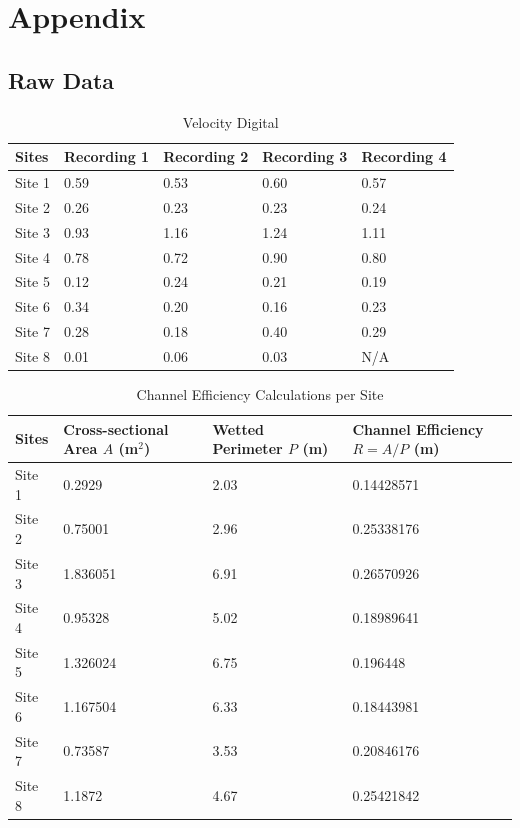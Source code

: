 \section{Appendix}

\subsection{Raw Data}

\begin{table}[H]
	\centering
	\begin{tabularx}{\textwidth}{l *{4}{Y}}
		\hline
		Sites & Recording 1 & Recording 2 & Recording 3 & Recording 4 \\
		\hline
		Site 1 & 0.59 & 0.53 & 0.60 & 0.57 \\
		Site 2 & 0.26 & 0.23 & 0.23 & 0.24 \\
		Site 3 & 0.93 & 1.16 & 1.24 & 1.11 \\
		Site 4 & 0.78 & 0.72 & 0.90 & 0.80 \\
		Site 5 & 0.12 & 0.24 & 0.21 & 0.19 \\
		Site 6 & 0.34 & 0.20 & 0.16 & 0.23 \\
		Site 7 & 0.28 & 0.18 & 0.40 & 0.29 \\
		Site 8 & 0.01 & 0.06 & 0.03 & N/A \\
		\hline
	\end{tabularx}
	\caption{Velocity Digital}
	\label{tab:velocity_digital_raw}
\end{table}

\begin{table}[H]
	\centering
	\begin{tabularx}{\textwidth}{l *{3}{Y}}
		\hline
		Sites & Cross-sectional Area $A$ (m$^2$) & Wetted Perimeter $P$ (m) & Channel Efficiency $R=A/P$ (m) \\
		\hline
		Site 1 & 0.2929 & 2.03  & 0.14428571 \\
		Site 2 & 0.75001 & 2.96 & 0.25338176 \\
		Site 3 & 1.836051 & 6.91 & 0.26570926 \\
		Site 4 & 0.95328 & 5.02 & 0.18989641 \\
		Site 5 & 1.326024 & 6.75 & 0.196448 \\
		Site 6 & 1.167504 & 6.33 & 0.18443981 \\
		Site 7 & 0.73587 & 3.53 & 0.20846176 \\
		Site 8 & 1.1872 & 4.67 & 0.25421842 \\
		\hline
	\end{tabularx}
	\caption{Channel Efficiency Calculations per Site}
	\label{tab:channel_efficiency_raw}
\end{table}

